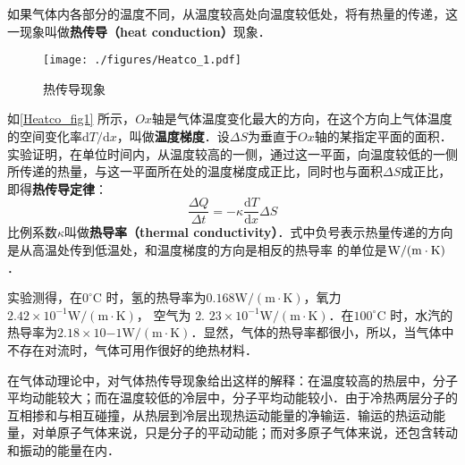 
如果气体内各部分的温度不同，从温度较高处向温度较低处，将有热量的传递，这一现象叫做\textbf{热传导（heat conduction）}现象．

\begin{figure}[ht]
\centering
\texttt{[image: ./figures/Heatco\_1.pdf]}
\caption{热传导现象} \label{Heatco_fig1}
\end{figure}

如\autoref{Heatco_fig1} 所示，$Ox$轴是气体温度变化最大的方向，在这个方向上气体温度的空间变化率$\mathrm dT/\mathrm dx$，叫做\textbf{温度梯度}．设$\Delta S$为垂直于$Ox $轴的某指定平面的面积．实验证明，在单位时间内，从温度较高的一侧，通过这一平面，向温度较低的一侧所传递的热量，与这一平面所在处的温度梯度成正比，同时也与面积$\Delta S$成正比，即得\textbf{热传导定律}：
\begin{equation}
\frac{\Delta Q}{\Delta t}=-\kappa \frac{\mathrm{d} T}{\mathrm{d} x} \Delta S
\end{equation}
比例系数$\kappa$叫做\textbf{热导率（thermal conductivity）}．式中负号表示热量传递的方向是从高温处传到低温处，和温度梯度的方向是相反的热导率
的单位是$\rm W /(m \cdot K)$．

实验测得，在$0^{\circ} \mathrm{C}$ 时，氢的热导率为$0.168 \mathrm{W} /(\mathrm{m} \cdot \mathrm{K})$，氧力$2.42\times 10^{-1} \mathrm{W} /(\mathrm{m} \cdot \mathrm{K})$， 空气为$\text { 2. } 23 \times 10^{-1} \mathrm{W} /(\mathrm{m} \cdot \mathrm{K})$．在$100^{\circ} \mathrm{C}$ 时，水汽的热导率为$2. 18\times  10{-1}\mathrm{W} /(\mathrm{m} \cdot \mathrm{K})$．显然，气体的热导率都很小，所以，当气体中不存在对流时，气体可用作很好的绝热材料．

在气体动理论中，对气体热传导现象给出这样的解释：在温度较高的热层中，分子平均动能较大；而在温度较低的冷层中，分子平均动能较小．由于冷热两层分子的互相掺和与相互碰撞，从热层到冷层出现热运动能量的净输运．输运的热运动能量，对单原子气体来说，只是分子的平动动能；而对多原子气体来说，还包含转动和振动的能量在内．